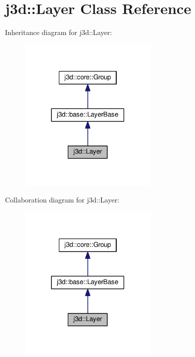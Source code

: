 \hypertarget{classj3d_1_1Layer}{}\section{j3d\+:\+:Layer Class Reference}
\label{classj3d_1_1Layer}


Inheritance diagram for j3d\+:\+:Layer\+:
\nopagebreak
\begin{figure}[H]
\begin{center}
\leavevmode
\includegraphics[width=189pt]{classj3d_1_1Layer__inherit__graph}
\end{center}
\end{figure}


Collaboration diagram for j3d\+:\+:Layer\+:
\nopagebreak
\begin{figure}[H]
\begin{center}
\leavevmode
\includegraphics[width=189pt]{classj3d_1_1Layer__coll__graph}
\end{center}
\end{figure}
